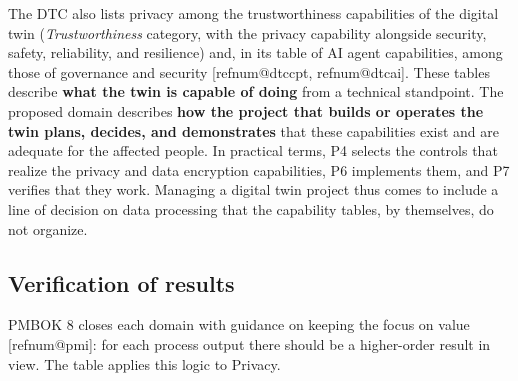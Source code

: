 \documentclass[12pt,a4paper,article,oneside,brazil,english]{abntex2}
\makeatletter
\newcommand{\refnum}[1]{\csname refnum@#1\endcsname}
\makeatother
\begin{document}
The DTC also lists privacy among the trustworthiness capabilities of the digital twin (\textit{Trustworthiness} category, with the privacy capability alongside security, safety, reliability, and resilience) and, in its table of AI agent capabilities, among those of governance and security [\refnum{dtccpt}, \refnum{dtcai}]. These tables describe \textbf{what the twin is capable of doing} from a technical standpoint. The proposed domain describes \textbf{how the project that builds or operates the twin plans, decides, and demonstrates} that these capabilities exist and are adequate for the affected people. In practical terms, P4 selects the controls that realize the privacy and data encryption capabilities, P6 implements them, and P7 verifies that they work. Managing a digital twin project thus comes to include a line of decision on data processing that the capability tables, by themselves, do not organize.
\subsection{Verification of results}

PMBOK 8 closes each domain with guidance on keeping the focus on value [\refnum{pmi}]: for each process output there should be a higher-order result in view. The table applies this logic to Privacy.
\end{document}
